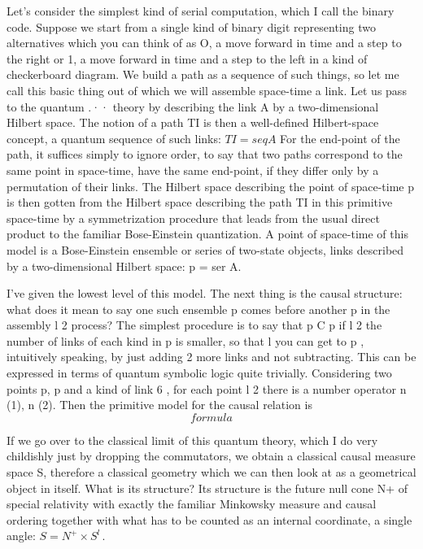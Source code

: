 Let's consider the simplest kind of serial computation, which I call the binary
code. Suppose we start from a single kind of binary digit representing two
alternatives which you can think of as O, a move forward in time and a step to
the right or 1, a move forward in time and a step to the left in a kind of
checkerboard diagram. We build a path as a sequence of such things, so let me
call this basic thing out of which we will assemble space-time a link. Let us
pass to the quantum .·· theory by describing the link A by a two-dimensional
Hilbert space. The notion of a path TI is then a well-defined Hilbert-space
concept, a quantum sequence of such links: $TI= seq A$ For the end-point of the
path, it suffices simply to ignore order, to say that two paths correspond to the
same point in space-time, have the same end-point, if they differ only by a
permutation of their links. The Hilbert space describing the point of space-time
p is then gotten from the Hilbert space describing the path TI in this primitive
space-time by a symmetrization procedure that leads from the usual direct product
to the familiar Bose-Einstein quantization. A point of space-time of this model
is a Bose-Einstein ensemble or series of two-state objects, links described by a
two-dimensional Hilbert space: p = ser A.

I've given the lowest level of this model. The next thing is the causal structure: what does it mean to say one such ensemble p comes before another p in the assembly
l 2
process? The simplest procedure is to say that p C p if
l 2
the number of links of each kind in p is smaller, so that
l
you can get to p , intuitively speaking, by just adding
2
more links and not subtracting. This can be expressed in
terms of quantum symbolic logic quite trivially. Considering
two points p, p and a kind of link 6 , for each point
l 2
there is a number operator n (1), n (2). Then the primitive
model for the causal relation is
\[formula\]

If we go over to the classical limit of this quantum theory, which I do very
childishly just by dropping the commutators, we obtain a classical causal measure
space S, therefore a classical geometry which we can then look at as a
geometrical object in itself. What is its structure? Its structure is the future
null cone N+ of special relativity with exactly the familiar Minkowsky measure
and causal ordering together with what has to be counted as an internal
coordinate, a single angle:
\(
S=N^+ \times S^l
\,.
\)

